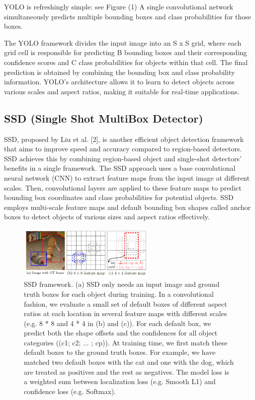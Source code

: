 \documentclass[conference]{IEEEtran}
\begin{document}
\begin{itemize}
YOLO is refreshingly simple: see Figure (1) A single convolutional network simultaneously predicts multiple bounding boxes and class probabilities for those boxes.


The YOLO framework divides the input image into an S x S grid, where each grid cell is responsible for predicting B bounding boxes and their corresponding confidence scores and C class probabilities for objects within that cell. The final prediction is obtained by combining the bounding box and class probability information. YOLO's architecture allows it to learn to detect objects across various scales and aspect ratios, making it suitable for real-time applications.

\subsection{SSD (Single Shot MultiBox Detector)}

SSD, proposed by Liu et al. [2], is another efficient object detection framework that aims to improve speed and accuracy compared to region-based detectors. SSD achieves this by combining region-based object and single-shot detectors' benefits in a single framework.
The SSD approach uses a base convolutional neural network (CNN) to extract feature maps from the input image at different scales\cite{b3}. Then, convolutional layers are applied to these feature maps to predict bounding box coordinates and class probabilities for potential objects. SSD employs multi-scale feature maps and default bounding box shapes called anchor boxes to detect objects of various sizes and aspect ratios effectively\cite{b4}.

\begin{figure}
	\includegraphics[width=250]{SSD1.jpg}
	\caption{
	SSD framework. (a) SSD only needs an input image and ground truth boxes for each object during training. In a convolutional fashion, we evaluate a small set of default boxes of different aspect ratios at each location in several feature maps with different scales (e.g. 8 * 8 and 4 * 4 in (b) and (c)). For each default box, we predict both the shape offsets and the confidences for all object categories ((c1; c2; ... ; cp)).
	At training time, we first match these default boxes to the ground truth boxes. For example, we have matched two default boxes with the cat and one with the dog, which are treated as positives and the rest as negatives. The model loss is a weighted sum between localization loss (e.g. Smooth L1) and confidence loss (e.g. Softmax).
	}
	\label{YOLODetectionSystem}
\end{figure}


\end{itemize}
\end{document}
